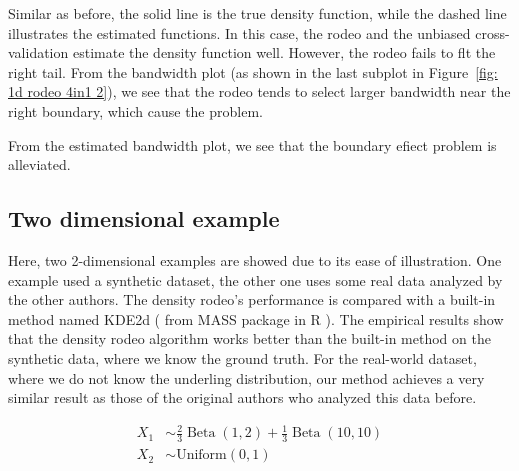 Similar as before, the solid line is the true density function, while the dashed line illustrates the estimated functions. 
In this case, the rodeo and the unbiased cross-validation estimate the density function well. 
However, the rodeo fails to flt the right tail. 
From the bandwidth plot (as shown in the last subplot in Figure~\ref{fig: 1d rodeo 4in1 2}), we see that the rodeo tends to select larger bandwidth near the right boundary, which cause the problem. 

From the estimated bandwidth plot, we see that the boundary efiect problem is alleviated. 

\subsection{Two dimensional example}
Here, two 2-dimensional examples are showed due to its ease of illustration. 
One example used a synthetic dataset, the other one uses some real data analyzed by the other authors. 
The density rodeo’s performance is compared with a built-in method named KDE2d ( from MASS package in R ). 
The empirical results show that the density rodeo algorithm works better than the built-in method on the synthetic data, where we know the ground truth. 
For the real-world dataset, where we do not know the underling distribution, our method achieves a very similar result as those of the original authors who analyzed this data before. 
\begin{example}
    \begin{equation}
        \begin{split}
            X_{1} & \sim \frac{2}{3} \operatorname{Beta}(1,2)+\frac{1}{3} \operatorname{Beta}(10,10) \\ 
            X_{2} & \sim \text {Uniform} (0,1)
        \end{split}
    \end{equation}
\end{example}

